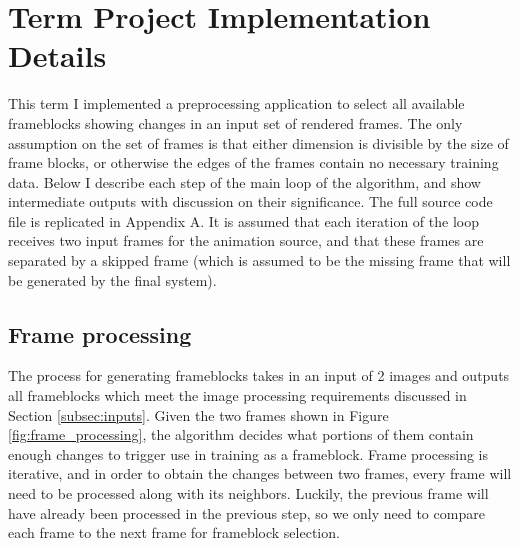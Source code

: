 \documentclass[conference]{IEEEtran}
\begin{document}
%

\section{Term Project Implementation Details}
\label{sec:implementation}
This term I implemented a preprocessing application to select all available frameblocks
showing changes in an input set of rendered frames. The only assumption on the
set of frames is that either dimension is divisible by the size of frame blocks,
or otherwise the edges of the frames contain no necessary training data. Below I
describe each step of the main loop of the algorithm, and show intermediate outputs with
discussion on their significance. The full source code file is replicated in Appendix A.
It is assumed that each iteration of the loop receives two input frames for the
animation source, and that these frames are separated by a skipped frame (which
is assumed to be the missing frame that will be generated by the final system).

\subsection{Frame processing}
\label{subsec:frame_processing}
The process for generating frameblocks takes in an input of 2 images and
outputs all frameblocks which meet the image processing requirements discussed
in Section \ref{subsec:inputs}.
Given the two frames shown in Figure \ref{fig:frame_processing},
the algorithm decides what portions of them contain enough changes to trigger
use in training as a frameblock.
Frame processing is iterative, and in order to obtain the changes between two
frames, every frame will need to be processed along with its neighbors.
Luckily, the previous frame will have already been processed in the previous
step, so we only need to compare each frame to the next frame for frameblock
selection.
\end{document}
